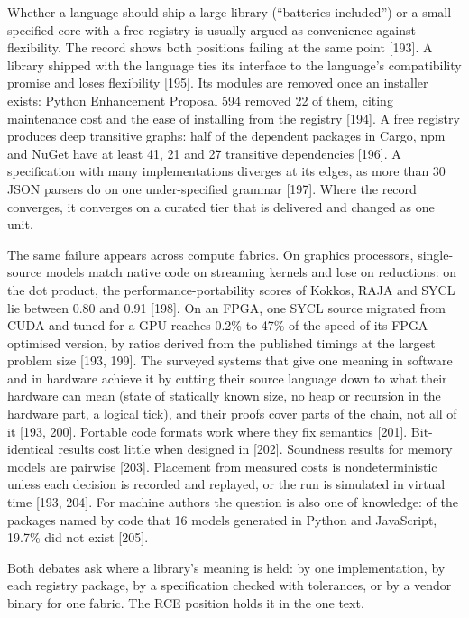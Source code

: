 \documentclass[10pt,letterpaper]{article}
\begin{document}
Whether a language should ship a large library (``batteries included'')
or a small specified core with a free registry is usually argued as
convenience against flexibility. The record shows both positions failing
at the same point {[}193{]}. A library shipped with the language ties
its interface to the language's compatibility promise and loses
flexibility {[}195{]}. Its modules are removed once an installer exists:
Python Enhancement Proposal 594 removed 22 of them, citing maintenance
cost and the ease of installing from the registry {[}194{]}. A free
registry produces deep transitive graphs: half of the dependent packages
in Cargo, npm and NuGet have at least 41, 21 and 27 transitive
dependencies {[}196{]}. A specification with many implementations
diverges at its edges, as more than 30 JSON parsers do on one
under-specified grammar {[}197{]}. Where the record converges, it
converges on a curated tier that is delivered and changed as one unit.

The same failure appears across compute fabrics. On graphics processors,
single-source models match native code on streaming kernels and lose on
reductions: on the dot product, the performance-portability scores of
Kokkos, RAJA and SYCL lie between 0.80 and 0.91 {[}198{]}. On an FPGA,
one SYCL source migrated from CUDA and tuned for a GPU reaches 0.2\% to
47\% of the speed of its FPGA-optimised version, by ratios derived from
the published timings at the largest problem size {[}193, 199{]}. The
surveyed systems that give one meaning in software and in hardware
achieve it by cutting their source language down to what their hardware
can mean (state of statically known size, no heap or recursion in the
hardware part, a logical tick), and their proofs cover parts of the
chain, not all of it {[}193, 200{]}. Portable code formats work where
they fix semantics {[}201{]}. Bit-identical results cost little when
designed in {[}202{]}. Soundness results for memory models are pairwise
{[}203{]}. Placement from measured costs is nondeterministic unless each
decision is recorded and replayed, or the run is simulated in virtual
time {[}193, 204{]}. For machine authors the question is also one of
knowledge: of the packages named by code that 16 models generated in
Python and JavaScript, 19.7\% did not exist {[}205{]}.

Both debates ask where a library's meaning is held: by one
implementation, by each registry package, by a specification checked
with tolerances, or by a vendor binary for one fabric. The RCE position
holds it in the one text.
\end{document}
